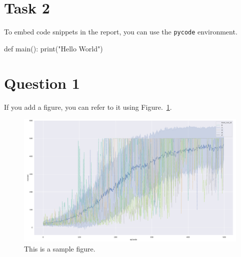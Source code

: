 \documentclass[12pt]{article}
\begin{document}
\section{Task 2}
To embed code snippets in the report, you can use the \texttt{pycode} environment.

\begin{pycode}
def main():
    print("Hello World")
\end{pycode}

\section{Question 1}

If you add a figure, you can refer to it using Figure.~\ref*{fig:fig1}.

\begin{figure}[h] 
	\centering  %
    \includegraphics[width=0.3\columnwidth]{img/training.pdf}
	\caption{This is a sample figure.}
	\label{fig:fig1}
\end{figure}


\end{document}
